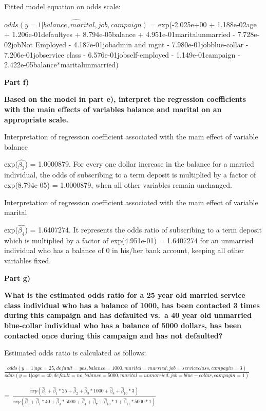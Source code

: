 \documentclass[
]{article}
\begin{document}
Fitted model equation on odds scale:

\(\hat{odds(y=1|balance,marital,job,campaign)}\) = exp(-2.025e+00 +
1.188e-02age + 1.206e-01defaultyes + 8.794e-05balance +
4.951e-01maritalunmarried - 7.728e-02jobNot Employed - 4.187e-01jobadmin
and mgnt - 7.980e-01jobblue-collar - 7.206e-01jobservice class -
6.576e-01jobself-employed - 1.149e-01campaign -
2.422e-05balance*maritalunmarried)

\textbf{Part f)}

\textbf{Based on the model in part e), interpret the regression
coefficients with the main effects of variables balance and marital on
an appropriate scale.}

Interpretation of regression coefficient associated with the main effect
of variable balance

exp(\(\hat{\beta_3}\)) = 1.0000879. For every one dollar increase in the
balance for a married individual, the odds of subscribing to a term
deposit is multiplied by a factor of exp(8.794e-05) = 1.0000879, when
all other variables remain unchanged.

Interpretation of regression coefficient associated with the main effect
of variable marital

exp(\(\hat{\beta_4}\)) = 1.6407274. It represents the odds ratio of
subscribing to a term deposit which is multiplied by a factor of
exp(4.951e-01) = 1.6407274 for an unmarried individual who has a balance
of 0 in his/her bank account, keeping all other variables fixed.

\textbf{Part g)}

\textbf{What is the estimated odds ratio for a 25 year old married
service class individual who has a balance of 1000, has been contacted 3
times during this campaign and has defaulted vs.~a 40 year old unmarried
blue-collar individual who has a balance of 5000 dollars, has been
contacted once during this campaign and has not defaulted?}

Estimated odds ratio is calculated as follows:

\(\frac{odds(y=1|age=25, default=yes, balance=1000, marital=married, job=service class, campagin=3)}{odds(y=1|age=40, default=no, balance=5000, marital=unmarried, job=blue-collar, campagin=1)}\)

=
\(\frac{exp(\hat\beta_0+\hat\beta_1*25+\hat\beta_2+\hat\beta_3*1000+\hat\beta_8+\hat\beta_{10}*3)}{exp(\hat\beta_0+\hat\beta_1*40+\hat\beta_3*5000+\hat\beta_4+\hat\beta_7+\hat\beta_{10}*1+\hat\beta_{11}*5000*1)}\)
\end{document}
